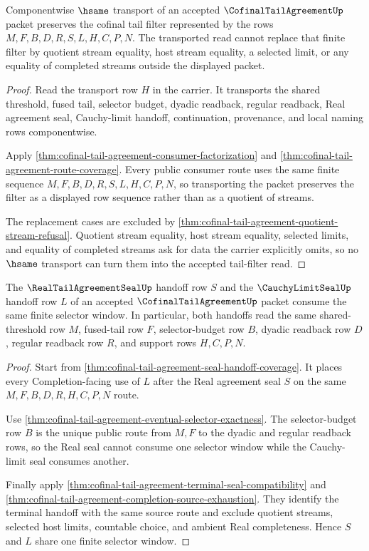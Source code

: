 \begin{theorem}
\label{thm:cofinal-tail-agreement-tail-filter-stability}
Componentwise $\hsame$ transport of an accepted $\CofinalTailAgreementUp$ packet preserves the cofinal tail filter represented by the rows $M,F,B,D,R,S,L,H,C,P,N$. The transported read cannot replace that finite filter by quotient stream equality, host stream equality, a selected limit, or any equality of completed streams outside the displayed packet.
\end{theorem}
\begin{proof}
Read the transport row $H$ in the carrier. It transports the shared threshold, fused tail, selector budget, dyadic readback, regular readback, Real agreement seal, Cauchy-limit handoff, continuation, provenance, and local naming rows componentwise.

Apply \autoref{thm:cofinal-tail-agreement-consumer-factorization} and \autoref{thm:cofinal-tail-agreement-route-coverage}. Every public consumer route uses the same finite sequence $M,F,B,D,R,S,L,H,C,P,N$, so transporting the packet preserves the filter as a displayed row sequence rather than as a quotient of streams.

The replacement cases are excluded by \autoref{thm:cofinal-tail-agreement-quotient-stream-refusal}. Quotient stream equality, host stream equality, selected limits, and equality of completed streams ask for data the carrier explicitly omits, so no $\hsame$ transport can turn them into the accepted tail-filter read.
\end{proof}

\begin{theorem}
\label{thm:cofinal-tail-agreement-completion-window-coherence}
The $\RealTailAgreementSealUp$ handoff row $S$ and the $\CauchyLimitSealUp$ handoff row $L$ of an accepted $\CofinalTailAgreementUp$ packet consume the same finite selector window. In particular, both handoffs read the same shared-threshold row $M$, fused-tail row $F$, selector-budget row $B$, dyadic readback row $D$, regular readback row $R$, and support rows $H,C,P,N$.
\end{theorem}
\begin{proof}
Start from \autoref{thm:cofinal-tail-agreement-seal-handoff-coverage}. It places every Completion-facing use of $L$ after the Real agreement seal $S$ on the same $M,F,B,D,R,H,C,P,N$ route.

Use \autoref{thm:cofinal-tail-agreement-eventual-selector-exactness}. The selector-budget row $B$ is the unique public route from $M,F$ to the dyadic and regular readback rows, so the Real seal cannot consume one selector window while the Cauchy-limit seal consumes another.

Finally apply \autoref{thm:cofinal-tail-agreement-terminal-seal-compatibility} and \autoref{thm:cofinal-tail-agreement-completion-source-exhaustion}. They identify the terminal handoff with the same source route and exclude quotient streams, selected host limits, countable choice, and ambient Real completeness. Hence $S$ and $L$ share one finite selector window.
\end{proof}

